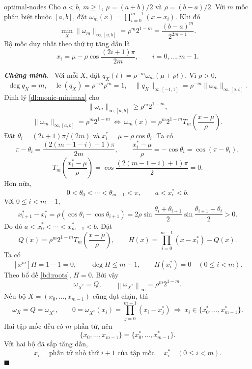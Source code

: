 \documentclass[12pt,a4paper,oneside]{book}
\numberwithin{algorithm}{chapter}
\theoremstyle{definition}
\newenvironment{chungminh}{\par\medskip\noindent\textbf{\textit{\color{mainblue}Chứng minh.}}\ }{\hfill$\blacksquare$\par\medskip}
\newcommand{\norminf}[1]{\left\lVert #1\right\rVert_{\infty}}
\newcommand{\lc}{\operatorname{lc}}
\begin{document}
\begin{hequa}{}{optimal-nodes}
Cho $a<b$, $m\geq1$, $\mu=(a+b)/2$ và $\rho=(b-a)/2$. Với $m$ mốc phân biệt thuộc $[a,b]$, đặt $\omega_m(x)=\prod_{i=0}^{m-1}(x-x_i)$. Khi đó
\begin{equation}\label{eq:minimal-node-product}
 \min_X\lVert \omega_m\rVert_{\infty,[a,b]}
 =\rho^m2^{1-m}=\frac{(b-a)^m}{2^{2m-1}}.
\end{equation}
Bộ mốc duy nhất theo thứ tự tăng dần là
\begin{equation}\label{eq:optimal-nodes}
 x_i=\mu-\rho\cos\frac{(2i+1)\pi}{2m},\qquad i=0,\ldots,m-1.
\end{equation}
\end{hequa}
\begin{chungminh}
Với mỗi $X$, đặt $q_X(t)=\rho^{-m}\omega_m(\mu+\rho t)$. Vì $\rho>0$,
\[
 \deg q_X=m,\quad\lc(q_X)=\rho^{-m}\rho^m=1,\quad
 \lVert q_X\rVert_{\infty,[-1,1]}=\rho^{-m}\lVert \omega_m\rVert_{\infty,[a,b]}.
\]
Định lý \ref{dl:monic-minimax} cho
\[
 \lVert \omega_m\rVert_{\infty,[a,b]}\geq\rho^m2^{1-m},
\]
\[
 \lVert \omega_m\rVert_{\infty,[a,b]}=\rho^m2^{1-m}
 \ \Longleftrightarrow\
 \omega_m(x)=\rho^m2^{1-m}T_m\left(\frac{x-\mu}{\rho}\right).
\]
Đặt $\theta_i=(2i+1)\pi/(2m)$ và $x_i^*=\mu-\rho\cos\theta_i$. Ta có
\[
 \pi-\theta_i=\frac{(2(m-1-i)+1)\pi}{2m},
 \qquad\frac{x_i^*-\mu}{\rho}=-\cos\theta_i=\cos(\pi-\theta_i),
\]
\[
 T_m\left(\frac{x_i^*-\mu}{\rho}\right)
 =\cos\frac{(2(m-1-i)+1)\pi}{2}=0.
\]
Hơn nữa,
\[
 0<\theta_0<\cdots<\theta_{m-1}<\pi,\qquad
 a<x_i^*<b.
\]
Với $0\leq i<m-1$,
\[
 x_{i+1}^*-x_i^*
 =\rho(\cos\theta_i-\cos\theta_{i+1})
 =2\rho\sin\frac{\theta_i+\theta_{i+1}}2
         \sin\frac{\theta_{i+1}-\theta_i}2>0.
\]
Do đó $a<x_0^*<\cdots<x_{m-1}^*<b$. Đặt
\[
 Q(x)=\rho^m2^{1-m}T_m\left(\frac{x-\mu}{\rho}\right),\qquad
 H(x)=\prod_{i=0}^{m-1}(x-x_i^*)-Q(x).
\]
Ta có
\[
 [x^m]H=1-1=0,\qquad\deg H\leq m-1,
 \qquad H(x_i^*)=0\quad(0\leq i<m).
\]
Theo bổ đề \ref{bd:roots}, $H=0$. Bởi vậy
\[
 \omega_{X^*}=Q,\qquad
 \norminf{\omega_{X^*}}=\rho^m2^{1-m}.
\]
Nếu bộ $X=(x_0,\ldots,x_{m-1})$ cũng đạt chặn, thì
\[
 \omega_X=Q=\omega_{X^*},\qquad
 0=\omega_{X^*}(x_i)=\prod_{j=0}^{m-1}(x_i-x_j^*)
 \ \Longrightarrow\ x_i\in\{x_0^*,\ldots,x_{m-1}^*\}.
\]
Hai tập mốc đều có $m$ phần tử, nên
\[
 \{x_0,\ldots,x_{m-1}\}=\{x_0^*,\ldots,x_{m-1}^*\}.
\]
Với hai bộ đã sắp tăng dần,
\[
 x_i=\text{phần tử nhỏ thứ }i+1\text{ của tập mốc}=x_i^*
 \quad(0\leq i<m).
\]
\end{chungminh}
\end{document}

